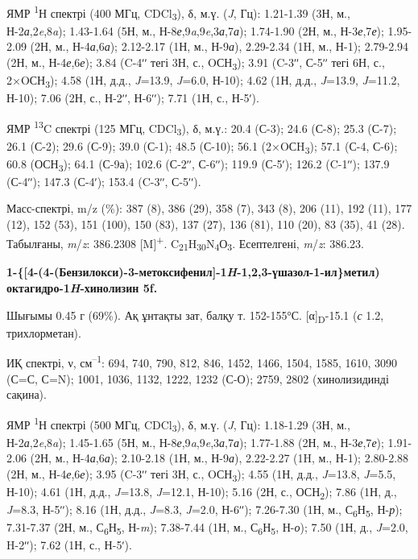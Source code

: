 \begin{multicols}{2}
ЯМР \textsuperscript{1}Н спектрі (400 МГц, CDCl\textsubscript{3}), δ,
м.ү. (\emph{J}, Гц): 1.21-1.39 (3Н, м.,
Н-2\emph{а},2\emph{e},8\emph{a}); 1.43-1.64 (5Н, м.,
Н-8\emph{е},9\emph{a},9\emph{e},3\emph{а},7\emph{а}); 1.74-1.90 (2Н, м.,
Н-3\emph{е},7\emph{е}); 1.95-2.09 (2Н, м., Н-4\emph{а},6\emph{а});
2.12-2.17 (1Н, м., Н-9\emph{а}), 2.29-2.34 (1H, м., Н-1); 2.79-2.94 (2Н,
м., Н-4\emph{е},6\emph{е}); 3.84 (C-4ʹʹ тегі 3Н, с.,
OСН\textsubscript{3}); 3.91 (C-3ʹʹ, С-5ʹʹ тегі 6Н, с.,
2×OСН\textsubscript{3}); 4.58 (1Н, д.д., \emph{J}=13.9, \emph{J}=6.0,
Н-10); 4.62 (1Н, д.д., \emph{J}=13.9, \emph{J}=11.2, Н-10); 7.06 (2Н,
с., Н-2ʹʹ, Н-6ʹʹ); 7.71 (1Н, с., Н-5ʹ). \hl{}

ЯМР \textsuperscript{13}C спектрі (125 МГц, CDCl\textsubscript{3}), δ,
м.ү.: 20.4 (С-3); 24.6 (С-8); 25.3 (С-7); 26.1 (С-2); 29.6 (С-9); 39.0
(С-1); 48.5 (С-10); 56.1 (2×OСH\textsubscript{3}); 57.1 (С-4, С-6); 60.8
(ОСН\textsubscript{3}); 64.1 (С-9а); 102.6 (С-2ʹʹ, С-6ʹʹ); 119.9 (С-5ʹ);
126.2 (C-1ʹʹ); 137.9 (С-4ʹʹ); 147.3 (С-4ʹ); 153.4 (C-3ʹʹ, С-5ʹʹ).

Масс-спектрі, m/z (\%): 387 (8), 386 (29), 358 (7), 343 (8), 206 (11),
192 (11), 177 (12), 152 (53), 151 (100), 150 (83), 137 (27), 136 (81),
110 (20), 83 (35), 41 (28). Табылғаны, \emph{m}/\emph{z}: 386.2308
{[}M{]}\textsuperscript{+}.
C\textsubscript{21}H\textsubscript{30}N\textsubscript{4}О\textsubscript{3}.
Есептелгені, \emph{m}/\emph{z}: 386.23.

{\bfseries 1-\{{[}4-(4-(Бензилокси)-3-метоксифенил{]}-1\emph{H}-1,2,3-үшазол-1-ил\}метил)
октагидро-1\emph{H}-хинолизин 5f.}

Шығымы 0.45 г (69\%). Ақ ұнтақты зат, балқу т. 152-155°С.
{[}α{]}\textsubscript{D}-15.1 (\emph{с} 1.2, трихлорметан). \hl{}

ИҚ спектрі, ν, см\textsuperscript{--1}: 694, 740, 790, 812, 846, 1452,
1466, 1504, 1585, 1610, 3090 (С=С, С=N); 1001, 1036, 1132, 1222, 1232
(С-О); 2759, 2802 (хинолизидинді сақина).

ЯМР \textsuperscript{1}Н спектрі (500 МГц, CDCl\textsubscript{3}), δ,
м.ү. (\emph{J}, Гц): 1.18-1.29 (3Н, м.,
Н-2\emph{а},2\emph{e},8\emph{a}); 1.45-1.65 (5Н, м.,
Н-8\emph{е},9\emph{a},9\emph{e},3\emph{а},7\emph{а}); 1.77-1.88 (2Н, м.,
Н-3\emph{е},7\emph{е}); 1.91-2.06 (2Н, м., Н-4\emph{а},6\emph{а});
2.10-2.18 (1Н, м., Н-9\emph{а}), 2.22-2.27 (1H, м., Н-1); 2.80-2.88 (2Н,
м., Н-4\emph{е},6\emph{е}); 3.95 (C-3ʹʹ тегі 3Н, с.,
OСН\textsubscript{3}); 4.55 (1Н, д.д., \emph{J}=13.8, \emph{J}=5.5,
Н-10); 4.61 (1Н, д.д., \emph{J}=13.8, \emph{J}=12.1, Н-10); 5.16 (2Н,
с., ОСН\textsubscript{2}); 7.86 (1Н, д., \emph{J}=8.3, Н-5ʹʹ); 8.16 (1Н,
д.д., \emph{J}=8.3, \emph{J}=2.0, Н-6ʹʹ); 7.26-7.30 (1Н, м.,
С\textsubscript{6}Н\textsubscript{5}, Н-\emph{р}); 7.31-7.37 (2Н, м.,
С\textsubscript{6}Н\textsubscript{5}, Н-\emph{m}); 7.38-7.44 (1Н, м.,
С\textsubscript{6}Н\textsubscript{5}, Н-\emph{о}); 7.50 (1Н, д.,
\emph{J}=2.0, H-2ʹʹ); 7.62 (1Н, с., Н-5ʹ).


\end{multicols}
